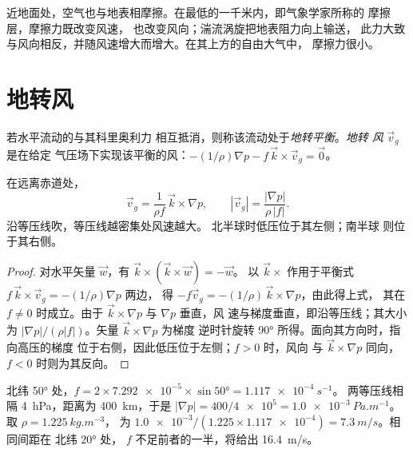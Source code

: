 近地面处，空气也与地表相摩擦。在最低的一千米内，即气象学家所称的
摩擦层，摩擦力既改变风速，
也改变风向；湍流涡旋把地表阻力向上输送，
此力大致与风向相反，并随风速增大而增大。在其上方的自由大气中，
摩擦力很小。

\section{地转风}\label{sec:b1:atmospheric-circulation:geostrophic}

\begin{definition}\label{def:b1:atmospheric-circulation:geostrophic}
若水平流动的与其科里奥利力
相互抵消，则称该流动处于\emph{地转平衡}。\emph{地转
风} $\vec v_g$ 是在给定
气压场下实现该平衡的风：$-(1/\rho)\nabla p - f\,\vec k\times\vec v_g = \vec 0$。
\end{definition}

\begin{theorem}[地转风]\label{thm:b1:atmospheric-circulation:geostrophic}
在远离赤道处，
\[
  \vec v_g = \frac{1}{\rho f}\,\vec k\times\nabla p, \qquad
  |\vec v_g| = \frac{|\nabla p|}{\rho\,|f|} .
\]
沿等压线吹，等压线越密集处风速越大。
北半球时低压位于其左侧；南半球
则位于其右侧。
\end{theorem}

\begin{proof}
对水平矢量 $\vec w$，有 $\vec k\times(\vec k\times\vec w) = -\vec w$。
以 $\vec k\times$ 作用于平衡式 $f\,\vec k\times\vec v_g = -(1/\rho)\nabla p$ 两边，
得 $-f\vec v_g = -(1/\rho)\,\vec k\times\nabla p$，由此得上式，
其在 $f \neq 0$ 时成立。由于 $\vec k\times\nabla p$ 与 $\nabla p$ 垂直，风
速与梯度垂直，即沿等压线；其大小为 $|\nabla
p|/(\rho|f|)$。矢量 $\vec k\times\nabla p$ 为梯度
逆时针旋转 \ang{90} 所得。面向其方向时，指向高压的梯度
位于右侧，因此低压位于左侧；$f > 0$ 时，风向
与 $\vec k\times\nabla p$ 同向，$f < 0$ 时则为其反向。
\end{proof}

\begin{example}[由等压线读出的风]\label{ex:b1:atmospheric-circulation:geostrophic}
北纬 \ang{50} 处，$f = 2 \times \num{7.292e-5} \times \sin\ang{50} = \qty{1.117e-4}{s^{-1}}$。
两等压线相隔 \qty{4}{hPa}，距离为 \qty{400}{km}，于是 $|\nabla p| = 400/\num{4e5} =
\qty{1.0e-3}{Pa.m^{-1}}$。取 $\rho = \qty{1.225}{kg.m^{-3}}$，
为 $\num{1.0e-3}/(1.225 \times \num{1.117e-4}) = \qty{7.3}{m/s}$。相同间距在
北纬 \ang{20} 处，
$f$ 不足前者的一半，将给出 \qty{16.4}{m/s}。
\end{example}

